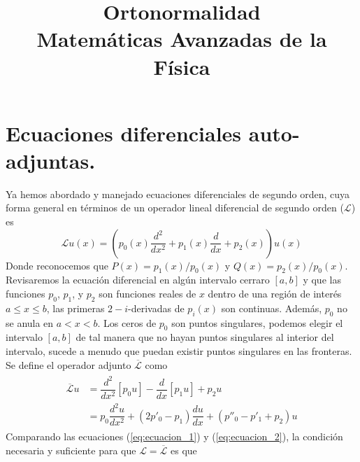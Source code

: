 
\usepackage{mathrsfs}
\title{Ortonormalidad \\ {\large Matemáticas Avanzadas de la Física}}
\date{ }

\renewcommand\labelenumii{\theenumi.{\arabic{enumii}}}
\maketitle
\fontsize{14}{14}\selectfont
\section{Ecuaciones diferenciales auto-adjuntas.}
Ya hemos abordado y manejado ecuaciones diferenciales de segundo orden, cuya forma general en términos de un operador lineal diferencial de segundo orden ($\mathscr{L}$) es
\begin{equation}
\mathscr{L} u(x) = \left( p_{0}(x) \dfrac{d^{2}}{d x^{2}} + p_{1}(x) \dfrac{d}{dx} + p_{2}(x) \right)  u(x)
\label{eq:ecuacion_1}
\end{equation}
Donde reconocemos que $P(x) = p_{1}(x)/p_{0}(x)$ y $Q(x)= p_{2}(x)/p_{0}(x)$.
\\
Revisaremos la ecuación diferencial en algún intervalo cerraro $[a,b]$ y que las funciones $p_{0}$, $p_{1}$, y $p_{2}$ son funciones reales de $x$ dentro de una región de interés $a \leq x \leq b$, las primeras $2-i$-derivadas de $p_{i}(x)$ son continuas. Además, $p_{0}$ no se anula en $a<x<b$. Los ceros de $p_{0}$ son puntos singulares, podemos elegir el intervalo $[a,b]$ de tal manera que no hayan puntos singulares al interior del intervalo, sucede a menudo que puedan existir puntos singulares en las fronteras.
\\
Se define el operador adjunto $\overline{\mathscr{L}}$ como
\begin{eqnarray}
\begin{aligned}
\overline{\mathscr{L}} u &= \dfrac{d^{2}}{d x^{2}}[ p_{0} u] - \dfrac{d}{dx} [p_{1} u] + p_{2} u \\
&= p_{0}\dfrac{d^{2} u}{d x^{2}} + (2 p'_{0} - p_{1}) \dfrac{du}{dx} + (p''_{0} - p'_{1} + p_{2}) u
\label{eq:ecuacion_2}
\end{aligned}
\end{eqnarray}
Comparando las ecuaciones (\ref{eq:ecuacion_1}) y (\ref{eq:ecuacion_2}), la condición necesaria y suficiente para que $\mathscr{L} = \overline{\mathscr{L}}$ es que
